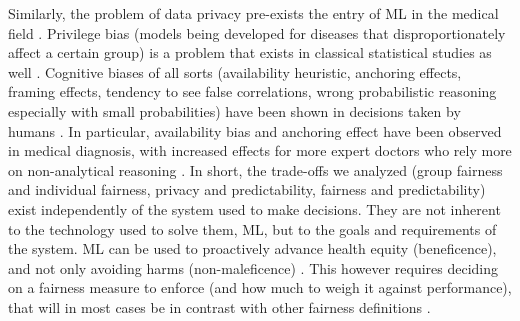    Similarly, the problem of data privacy pre-exists the entry of ML in the medical field \cite{Dijkstra2020}.
    Privilege bias (models being developed for diseases that disproportionately affect a certain group) \cite{Rajkomar2018} is a problem that exists in classical statistical studies as well \cite{Jackson2019}.
    Cognitive biases of all sorts (availability heuristic, anchoring effects, framing effects, tendency to see false correlations, wrong probabilistic reasoning especially with small probabilities) have been shown in decisions taken by humans \cite{Zerilli2019}.
    In particular, availability bias and anchoring effect have been observed in medical diagnosis, with increased effects for more expert doctors who rely more on non-analytical reasoning \cite{Mamede2010}.
    In short, the trade-offs we analyzed (group fairness and individual fairness, privacy and predictability, fairness and predictability) exist independently of the system used to make decisions.
    They are not inherent to the technology used to solve them, ML, but to the goals and requirements of the system.
    ML can be used to proactively advance health equity (beneficence), and not only avoiding harms (non-maleficence) \cite{Rajkomar2018}\cite{Mccradden2020}.
    This however requires deciding on a fairness measure to enforce (and how much to weigh it against performance), that will in most cases be in contrast with other fairness definitions \cite{Zerilli2019}.



